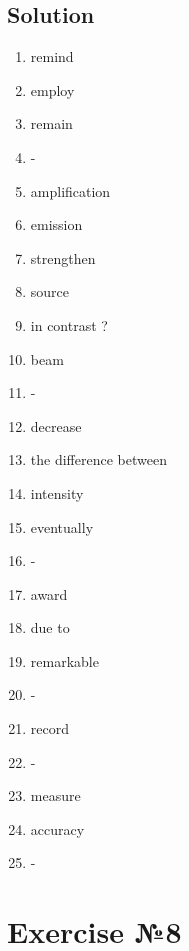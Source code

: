 \documentclass[12pt, a4paper]{report}
\begin{document}
\subsection*{Solution}
\begin{enumerate}
    \item remind
    \item employ
    \item remain
    \item -
    \item amplification
    \item emission
    \item strengthen
    \item source
    \item in contrast ?
    \item beam
    \item -
    \item decrease
    \item the difference between
    \item intensity
    \item eventually
    \item -
    \item award
    \item due to
    \item remarkable
    \item -
    \item record
    \item -
    \item measure
    \item accuracy
    \item -
\end{enumerate} \leavevmode\newline

\section{Exercise №8}
\end{document}
